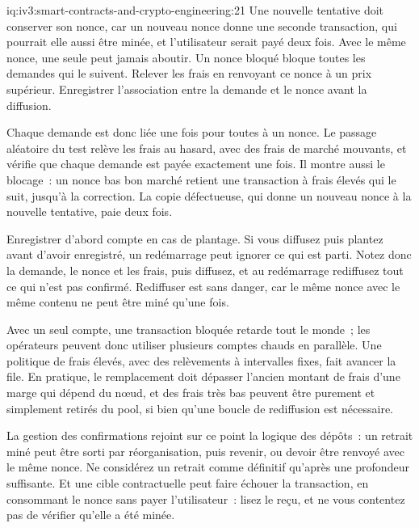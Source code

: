 \begin{solution}{iq:iv3:smart-contracts-and-crypto-engineering:21}
Une nouvelle tentative doit conserver son nonce, car un nouveau nonce donne une seconde transaction, qui pourrait elle aussi être minée, et l'utilisateur serait payé deux fois. Avec le même nonce, une seule peut jamais aboutir. Un nonce bloqué bloque toutes les demandes qui le suivent. Relever les frais en renvoyant ce nonce à un prix supérieur. Enregistrer l'association entre la demande et le nonce avant la diffusion.
\label{lst:iv3:cr:withdraw}

Chaque demande est donc liée une fois pour toutes à un nonce. Le passage aléatoire du test relève les frais au hasard, avec des frais de marché mouvants, et vérifie que chaque demande est payée exactement une fois. Il montre aussi le blocage~: un nonce bas bon marché retient une transaction à frais élevés qui le suit, jusqu'à la correction. La copie défectueuse, qui donne un nouveau nonce à la nouvelle tentative, paie deux fois.

Enregistrer d'abord compte en cas de plantage. Si vous diffusez puis plantez avant d'avoir enregistré, un redémarrage peut ignorer ce qui est parti. Notez donc la demande, le nonce et les frais, puis diffusez, et au redémarrage rediffusez tout ce qui n'est pas confirmé. Rediffuser est sans danger, car le même nonce avec le même contenu ne peut être miné qu'une fois.

Avec un seul compte, une transaction bloquée retarde tout le monde~; les opérateurs peuvent donc utiliser plusieurs comptes chauds en parallèle. Une politique de frais élevés, avec des relèvements à intervalles fixes, fait avancer la file. En pratique, le remplacement doit dépasser l'ancien montant de frais d'une marge qui dépend du nœud, et des frais très bas peuvent être purement et simplement retirés du pool, si bien qu'une boucle de rediffusion est nécessaire.

La gestion des confirmations rejoint sur ce point la logique des dépôts~: un retrait miné peut être sorti par réorganisation, puis revenir, ou devoir être renvoyé avec le même nonce. Ne considérez un retrait comme définitif qu'après une profondeur suffisante. Et une cible contractuelle peut faire échouer la transaction, en consommant le nonce sans payer l'utilisateur~: lisez le reçu, et ne vous contentez pas de vérifier qu'elle a été minée.

\end{solution}

